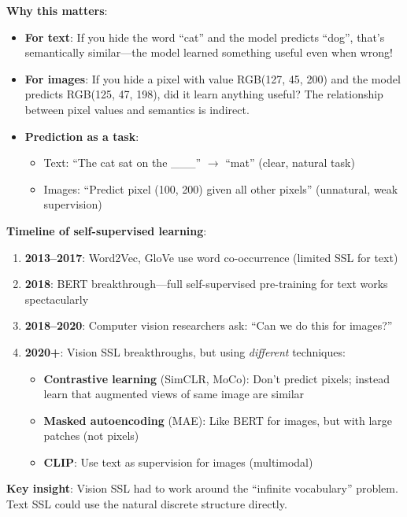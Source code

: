 \documentclass{article}
\begin{document}
\textbf{Why this matters}:

\begin{itemize}
\item \textbf{For text}: If you hide the word ``cat'' and the model predicts ``dog'', that's semantically similar---the model learned something useful even when wrong!

\item \textbf{For images}: If you hide a pixel with value RGB(127, 45, 200) and the model predicts RGB(125, 47, 198), did it learn anything useful? The relationship between pixel values and semantics is indirect.

\item \textbf{Prediction as a task}:
\begin{itemize}
\item Text: ``The cat sat on the \_\_\_'' $\rightarrow$ ``mat'' (clear, natural task)
\item Images: ``Predict pixel (100, 200) given all other pixels'' (unnatural, weak supervision)
\end{itemize}
\end{itemize}

\begin{tcolorbox}[colback=blue!5!white, colframe=blue!75!black, title=The Historical Development]
\textbf{Timeline of self-supervised learning}:

\begin{enumerate}
\item \textbf{2013--2017}: Word2Vec, GloVe use word co-occurrence (limited SSL for text)

\item \textbf{2018}: BERT breakthrough---full self-supervised pre-training for text works spectacularly

\item \textbf{2018--2020}: Computer vision researchers ask: ``Can we do this for images?''

\item \textbf{2020+}: Vision SSL breakthroughs, but using \textit{different} techniques:
\begin{itemize}
\item \textbf{Contrastive learning} (SimCLR, MoCo): Don't predict pixels; instead learn that augmented views of same image are similar
\item \textbf{Masked autoencoding} (MAE): Like BERT for images, but with large patches (not pixels)
\item \textbf{CLIP}: Use text as supervision for images (multimodal)
\end{itemize}
\end{enumerate}

\textbf{Key insight}: Vision SSL had to work around the ``infinite vocabulary'' problem. Text SSL could use the natural discrete structure directly.
\end{tcolorbox}
\end{document}
